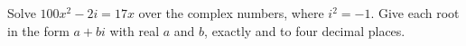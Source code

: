 Solve $100x^2-2i=17x$ over the complex numbers, where $i^2=-1$. Give each root in the form $a+bi$ with real $a$ and $b$, exactly and to four decimal places.
